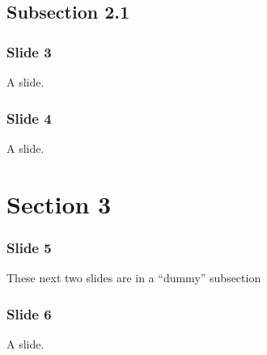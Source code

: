 
\subsection*{%
  Subsection 2.1}

\begin{frame}[fragile]
\frametitle{Slide 3}


A slide.
\end{frame}

\begin{frame}[fragile]
\frametitle{Slide 4}


A slide.
\end{frame}



\section*{%
  Section 3}

\begin{frame}[fragile]
\frametitle{Slide 5}


These next two slides are in a ``dummy'' subsection
\end{frame}

\begin{frame}[fragile]
\frametitle{Slide 6}


A slide.
\end{frame}
